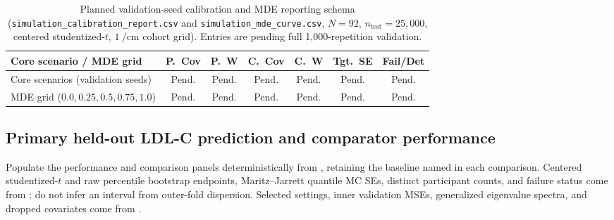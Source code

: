 \documentclass[preprint,12pt]{elsarticle}
\begin{document}
\begin{table}[ht]
\centering
\caption{Planned validation-seed calibration and MDE reporting schema (\texttt{simulation\_calibration\_report.csv} and \texttt{simulation\_mde\_curve.csv}, $N=92$, $n_{\text{test}}=25{,}000$, centered studentized-$t$, $1~\si{\per\centi\metre}$ cohort grid). Entries are pending full 1,000-repetition validation.}
\label{tab:simulation_calibration}
\footnotesize
\setlength{\tabcolsep}{3.5pt}
\begin{tabularx}{\textwidth}{@{}>{\raggedright\arraybackslash}X c c c c c c@{}}
\toprule
Core scenario / MDE grid & P.\ Cov & P.\ W & C.\ Cov & C.\ W & Tgt.\ SE & Fail/Det \\
\midrule
Core scenarios (validation seeds) & Pend. & Pend. & Pend. & Pend. & Pend. & Pend. \\
MDE grid ($0.0, 0.25, 0.5, 0.75, 1.0$) & Pend. & Pend. & Pend. & Pend. & Pend. & Pend. \\
\bottomrule
\end{tabularx}
\end{table}

\subsection{Primary held-out LDL-C prediction and comparator performance}
\label{subsec:results_primary}

Populate the performance and comparison panels deterministically from , retaining the baseline named in each comparison. Centered studentized-$t$ and raw percentile bootstrap endpoints, Maritz--Jarrett quantile MC SEs, distinct participant counts, and failure status come from ; do not infer an interval from outer-fold dispersion. Selected settings, inner validation MSEs, generalized eigenvalue spectra, and dropped covariates come from .
\end{document}

